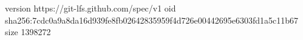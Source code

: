 version https://git-lfs.github.com/spec/v1
oid sha256:7cdc0a9a8da16d939fe8fb02642835959f4d726e00442695e6303fd1a5c11b67
size 1398272
